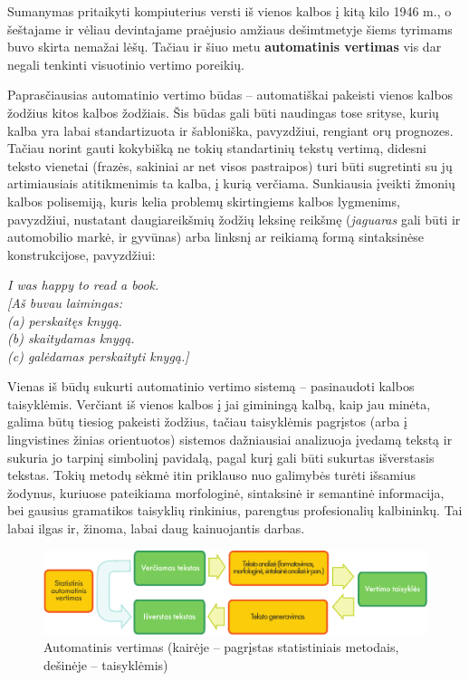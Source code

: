 \begin{multicols}{2}
 Sumanymas pritaikyti kompiuterius versti iš vienos kalbos į kitą kilo 1946 m., o šeštajame ir vėliau devintajame praėjusio amžiaus dešimtmetyje šiems tyrimams buvo skirta nemažai lėšų. Tačiau ir šiuo metu \textbf{automatinis vertimas} vis dar negali tenkinti visuotinio vertimo poreikių.

Paprasčiausias automatinio vertimo būdas – automatiškai pakeisti vienos kalbos žodžius kitos kalbos žodžiais. Šis būdas gali būti naudingas tose srityse, kurių kalba yra labai standartizuota ir šabloniška, pavyzdžiui, rengiant orų prognozes. Tačiau norint gauti kokybišką ne tokių standartinių tekstų vertimą, didesni teksto vienetai (frazės, sakiniai ar net visos pastraipos) turi būti sugretinti su jų artimiausiais atitikmenimis ta kalba, į kurią verčiama. Sunkiausia įveikti žmonių kalbos polisemiją, kuris kelia problemų skirtingiems kalbos lygmenims, pavyzdžiui, nustatant daugiareikšmių žodžių leksinę reikšmę (\textit{jaguaras} gali būti ir automobilio markė, ir gyvūnas) arba linksnį ar reikiamą formą sintaksinėse konstrukcijose, pavyzdžiui:

 \textit{I was happy to read a book.\\
      {[}Aš buvau laimingas:{}\\
      {}(a) perskaitęs knygą.{}\\
      {}(b) skaitydamas knygą.{}\\
      {}(c) galėdamas perskaityti knygą.{]} }     

Vienas iš būdų sukurti automatinio vertimo sistemą – pasinaudoti kalbos taisyklėmis. Verčiant iš vienos kalbos į jai giminingą kalbą, kaip jau minėta, galima būtų tiesiog pakeisti žodžius, tačiau taisyklėmis pagrįstos (arba į lingvistines žinias orientuotos) sistemos dažniausiai analizuoja įvedamą tekstą ir sukuria jo tarpinį simbolinį pavidalą, pagal kurį gali būti sukurtas išverstasis tekstas. Tokių metodų sėkmė itin priklauso nuo galimybės turėti išsamius žodynus, kuriuose pateikiama morfologinė, sintaksinė ir semantinė informacija, bei gausius gramatikos taisyklių rinkinius, parengtus profesionalių kalbininkų. Tai labai ilgas ir, žinoma, labai daug kainuojantis darbas.


\begin{figure}[htb]
  \center
  \includegraphics[width=\textwidth]{../_media/lithuanian/machine_translation}
  \caption{Automatinis vertimas (kairėje – pagrįstas statistiniais metodais, dešinėje – taisyklėmis)}  %
  \label{fig:mtarch_de}
\end{figure}


\end{multicols}
